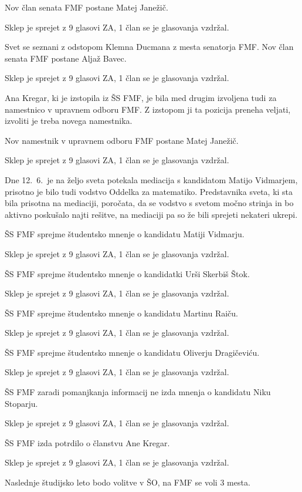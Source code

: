 \documentclass{seja}
\begin{document}
\begin{ad}
	\begin{sklep}
		Nov član senata FMF postane Matej Janežič.
	\end{sklep}
	Sklep je sprejet z 9 glasovi ZA, 1 član se je glasovanja vzdržal. 
	
	\begin{sklep}
		Svet se seznani z odstopom Klemna Ducmana z mesta senatorja FMF. Nov član senata FMF postane Aljaž Bavec.
	\end{sklep}
	Sklep je sprejet z 9 glasovi ZA, 1 član se je glasovanja vzdržal. 
	
	\item 
	Ana Kregar, ki je izstopila iz ŠS FMF, je bila med drugim izvoljena tudi za namestnico v upravnem odboru FMF. Z izstopom ji ta pozicija preneha veljati, izvoliti je treba novega namestnika.
	\begin{sklep}
		Nov namestnik v upravnem odboru FMF postane Matej Janežič.
	\end{sklep}
	Sklep je sprejet z 9 glasovi ZA, 1 član se je glasovanja vzdržal. 
	
	\item
	Dne 12.~6.~je na željo sveta potekala mediacija s kandidatom Matijo Vidmarjem, prisotno je bilo tudi vodstvo Oddelka za matematiko. Predstavnika sveta, ki sta bila prisotna na mediaciji, poročata, da se vodstvo s svetom močno strinja in bo aktivno poskušalo najti rešitve, na mediaciji pa so že bili sprejeti nekateri ukrepi.
	\begin{sklep}
		ŠS FMF sprejme študentsko mnenje o kandidatu Matiji Vidmarju.
	\end{sklep}
	Sklep je sprejet z 9 glasovi ZA, 1 član se je glasovanja vzdržal. 
	\begin{sklep}
		ŠS FMF sprejme študentsko mnenje o kandidatki Urši Skerbiš Štok.
	\end{sklep}
	Sklep je sprejet z 9 glasovi ZA, 1 član se je glasovanja vzdržal. 
	\begin{sklep}
		ŠS FMF sprejme študentsko mnenje o kandidatu Martinu Raiču. 
	\end{sklep}
	Sklep je sprejet z 9 glasovi ZA, 1 član se je glasovanja vzdržal. 
	\begin{sklep}
		ŠS FMF sprejme študentsko mnenje o kandidatu Oliverju Dragičeviću.
	\end{sklep}
	Sklep je sprejet z 9 glasovi ZA, 1 član se je glasovanja vzdržal. 
	\begin{sklep}
		ŠS FMF zaradi pomanjkanja informacij ne izda mnenja o kandidatu Niku Stoparju.
	\end{sklep}
	Sklep je sprejet z 9 glasovi ZA, 1 član se je glasovanja vzdržal. 
	
	\item
	\begin{sklep}
	    ŠS FMF izda potrdilo o članstvu Ane Kregar.
	\end{sklep}
	Sklep je sprejet z 9 glasovi ZA, 1 član se je glasovanja vzdržal.
	
	\item Naslednje študijsko leto bodo volitve v ŠO, na FMF se voli 3 mesta.
	
\end{ad}
\end{document}
